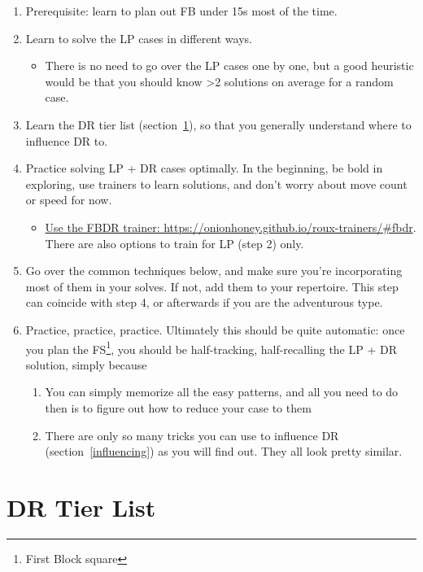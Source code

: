 \documentclass[12pt,letter]{article}
\begin{document}
\begin{enumerate}
    \item Prerequisite: learn to plan out FB under 15s most of the time.
    \item Learn to solve the LP cases in different ways. 
    \begin{itemize}
        \item There is no need to go over the LP cases one by one, but a good heuristic would be that you should know \textgreater 2 solutions on average for a random case.
    \end{itemize}
    \item Learn the DR tier list (section~\ref{drtier}), so that you generally understand where to influence DR to.
    \item Practice solving LP + DR cases optimally. In the beginning, be bold in exploring, use trainers to learn solutions, and don’t worry about move count or speed for now. 
    \begin{itemize}
        \item \href{https://onionhoney.github.io/roux-trainers/#fbdr}{Use the FBDR trainer: https://onionhoney.github.io/roux-trainers/\#fbdr}. There are also options to train for LP (step 2) only.
    \end{itemize}
    \item Go over the common techniques below, and make sure you’re incorporating most of them in your solves. If not, add them to your repertoire. This step can coincide with step 4, or afterwards if you are the adventurous type.
    \item Practice, practice, practice. Ultimately this should be quite automatic: once you plan the FS\footnote{First Block square}, you should be half-tracking, half-recalling the LP + DR solution, simply because 
    \begin{enumerate}
        \item You can simply memorize all the easy patterns, and all you need to do then is to figure out how to reduce your case to them
        \item There are only so many tricks you can use to influence DR (section~\ref{influencing}) as you will find out. They all look pretty similar.
    \end{enumerate}
\end{enumerate}

\section{DR Tier List}\label{drtier}
\end{document}
